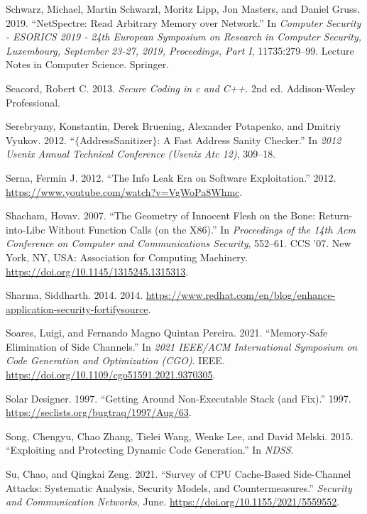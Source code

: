 \documentclass[a4paper,]{report}
\begin{document}
\leavevmode\hypertarget{ref-Schwarz2019}{}%
Schwarz, Michael, Martin Schwarzl, Moritz Lipp, Jon Masters, and Daniel
Gruss. 2019. ``NetSpectre: Read Arbitrary Memory over Network.'' In
\emph{Computer Security - ESORICS 2019 - 24th European Symposium on
Research in Computer Security, Luxembourg, September 23-27, 2019,
Proceedings, Part I}, 11735:279--99. Lecture Notes in Computer Science.
Springer.

\leavevmode\hypertarget{ref-Seacord2013}{}%
Seacord, Robert C. 2013. \emph{Secure Coding in c and C++}. 2nd ed.
Addison-Wesley Professional.

\leavevmode\hypertarget{ref-Serebryany2012}{}%
Serebryany, Konstantin, Derek Bruening, Alexander Potapenko, and Dmitriy
Vyukov. 2012. ``\(\{\)AddressSanitizer\(\}\): A Fast Address Sanity
Checker.'' In \emph{2012 Usenix Annual Technical Conference (Usenix Atc
12)}, 309--18.

\leavevmode\hypertarget{ref-Serna2012}{}%
Serna, Fermin J. 2012. ``The Info Leak Era on Software Exploitation.''
2012. \url{https://www.youtube.com/watch?v=VgWoPa8Whmc}.

\leavevmode\hypertarget{ref-Shacham2007}{}%
Shacham, Hovav. 2007. ``The Geometry of Innocent Flesh on the Bone:
Return-into-Libc Without Function Calls (on the X86).'' In
\emph{Proceedings of the 14th Acm Conference on Computer and
Communications Security}, 552--61. CCS '07. New York, NY, USA:
Association for Computing Machinery.
\url{https://doi.org/10.1145/1315245.1315313}.

\leavevmode\hypertarget{ref-Sharma2014}{}%
Sharma, Siddharth. 2014. 2014.
\url{https://www.redhat.com/en/blog/enhance-application-security-fortifysource}.

\leavevmode\hypertarget{ref-Soares2021}{}%
Soares, Luigi, and Fernando Magno Quintan Pereira. 2021. ``Memory-Safe
Elimination of Side Channels.'' In \emph{2021 IEEE/ACM International
Symposium on Code Generation and Optimization (CGO)}. IEEE.
\url{https://doi.org/10.1109/cgo51591.2021.9370305}.

\leavevmode\hypertarget{ref-Solar1997}{}%
Solar Designer. 1997. ``Getting Around Non-Executable Stack (and Fix).''
1997. \url{https://seclists.org/bugtraq/1997/Aug/63}.

\leavevmode\hypertarget{ref-Song2015}{}%
Song, Chengyu, Chao Zhang, Tielei Wang, Wenke Lee, and David Melski.
2015. ``Exploiting and Protecting Dynamic Code Generation.'' In
\emph{NDSS}.

\leavevmode\hypertarget{ref-Su2021}{}%
Su, Chao, and Qingkai Zeng. 2021. ``Survey of CPU Cache-Based
Side-Channel Attacks: Systematic Analysis, Security Models, and
Countermeasures.'' \emph{Security and Communication Networks}, June.
\url{https://doi.org/10.1155/2021/5559552}.
\end{document}
